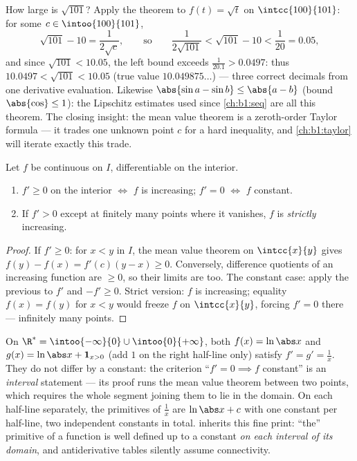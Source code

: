 \begin{example}\label{ex:b1:derivative:mvtestimate}
How large is $\sqrt{101}$? Apply the theorem to $f(t) = \sqrt t$
on $\intcc{100}{101}$: for some $c \in \intoo{100}{101}$,
\[
\sqrt{101} - 10 = \frac{1}{2\sqrt c},
\qquad\text{so}\qquad
\frac{1}{2\sqrt{101}} < \sqrt{101} - 10 < \frac{1}{20} = 0.05 ,
\]
and since $\sqrt{101} < 10.05$, the left bound exceeds
$\frac{1}{20.1} > 0.0497$: thus $10.0497 < \sqrt{101} < 10.05$
(true value $10.049875\dots$) --- three correct decimals from one
derivative evaluation. Likewise $\abs{\sin a - \sin b} \leq
\abs{a - b}$ (bound $\abs{\cos}\leq 1$): the Lipschitz estimates
used since \cref{ch:b1:seq} are all this theorem. The closing
insight: the mean value theorem is a zeroth-order Taylor formula
--- it trades one unknown point $c$ for a hard inequality, and
\cref{ch:b1:taylor} will iterate exactly this trade.
\end{example}

\begin{corollary}\label{cor:b1:derivative:monotone}
Let $f$ be continuous on $I$, differentiable on the interior.
\begin{enumerate}
  \item $f' \geq 0$ on the interior $\iff$ $f$ is increasing; $f' = 0$
        $\iff$ $f$ constant.
  \item If $f' > 0$ except at finitely many points where it vanishes,
        $f$ is \emph{strictly} increasing.
\end{enumerate}
\end{corollary}

\begin{proof}
If $f' \geq 0$: for $x < y$ in $I$, the mean value theorem on
$\intcc{x}{y}$ gives $f(y) - f(x) = f'(c)(y - x) \geq 0$. Conversely,
difference quotients of an increasing function are $\geq 0$, so their
limits are too. The constant case: apply the previous to $f'$ and
$-f' \geq 0$. Strict version: $f$ is increasing; equality $f(x) =
f(y)$ for $x < y$ would freeze $f$ on $\intcc{x}{y}$, forcing $f' =
0$ there --- infinitely many points.
\end{proof}

\begin{example}\label{ex:b1:derivative:intervalmatters}
On $\R^* = \intoo{-\infty}{0} \cup \intoo{0}{+\infty}$, both
$f(x) = \ln\abs x$ and $g(x) = \ln\abs x + \mathbf{1}_{x>0}$
(add $1$ on the right half-line only) satisfy $f' = g' =
\frac1x$. They do not differ by a constant: the criterion
``$f' = 0 \implies f$ constant'' is an \emph{interval} statement
--- its proof runs the mean value theorem between two points,
which requires the whole segment joining them to lie in the
domain. On each half-line separately, the primitives of
$\frac1x$ are $\ln\abs x + c$ with one constant per half-line,
two independent constants in total. 
inherits this fine print: ``the'' primitive of a function is
well defined up to a constant \emph{on each interval of its
domain}, and antiderivative tables silently assume connectivity.
\end{example}


